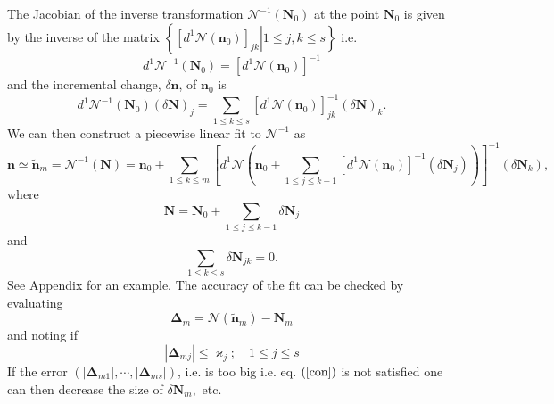 \documentclass[aps,preprint]{revtex4}%
\begin{document}
The Jacobian of the inverse transformation $\mathcal{N}^{-1}\left(
\mathbf{N}_{0}\right)  $ at the point $\mathbf{N}_{0}$ is given by the inverse
of the matrix $\left\{  \left.  \left[  d^{1}\mathcal{N}\left(  \mathbf{n}%
_{0}\right)  \right]  _{jk}\right\vert 1\leq j,k\leq s\right\}  $ i.e.
\begin{equation}
d^{1}\mathcal{N}^{-1}\left(  \mathbf{N}_{0}\right)  =\left[  d^{1}%
\mathcal{N}\left(  \mathbf{n}_{0}\right)  \right]  ^{-1}%
\end{equation}
and the incremental change, $\delta\mathbf{n}$, of $\mathbf{n}_{0}$ is
\begin{equation}
d^{1}\mathcal{N}^{-1}\left(  \mathbf{N}_{0}\right)  \left(  \delta
\mathbf{N}\right)  _{j}=\sum_{1\leq k\leq s}\left[  d^{1}\mathcal{N}\left(
\mathbf{n}_{0}\right)  \right]  _{jk}^{-1}\left(  \delta\mathbf{N}\right)
_{k}.
\end{equation}
We can then construct a piecewise linear fit to $\mathcal{N}^{-1}$ as%
\begin{equation}
\mathbf{n}\simeq\mathbf{\tilde{n}}_{m}=\mathcal{N}^{-1}\left(  \mathbf{N}%
\right)  =\mathbf{n}_{0}+\sum_{1\leq k\leq m}\left[  d^{1}\mathcal{N}\left(
\mathbf{n}_{0}+\sum_{1\leq j\leq k-1}\left[  d^{1}\mathcal{N}\left(
\mathbf{n}_{0}\right)  \right]  ^{-1}\left(  \delta\mathbf{N}_{j}\right)
\right)  \right]  ^{-1}\left(  \delta\mathbf{N}_{k}\right)  ,
\end{equation}
where
\begin{equation}
\mathbf{N=N}_{0}+\sum_{1\leq j\leq k-1}\delta\mathbf{N}_{j}%
\end{equation}
and
\begin{equation}
\sum_{1\leq k\leq s}\delta\mathbf{N}_{jk}=0.
\end{equation}
See Appendix \label{linfit} for an example. The accuracy of the fit can be
checked by evaluating
\begin{equation}
\mathbf{\Delta}_{m}=\mathcal{N}\left(  \mathbf{\tilde{n}}_{m}\right)
-\mathbf{N}_{m}%
\end{equation}
and noting if
\begin{equation}
\left\vert \mathbf{\Delta}_{mj}\right\vert \leq\varkappa_{j};\quad1\leq j\leq
s \label{con}%
\end{equation}
If the error $\left(  \left\vert \mathbf{\Delta}_{m1}\right\vert
,\cdots,\left\vert \mathbf{\Delta}_{ms}\right\vert \right)  $, i.e. is too big
i.e. eq. $\left(  \ref{con}\right)  $ is not satisfied one can then decrease
the size of $\delta\mathbf{N}_{m},$ etc.
\end{document}
